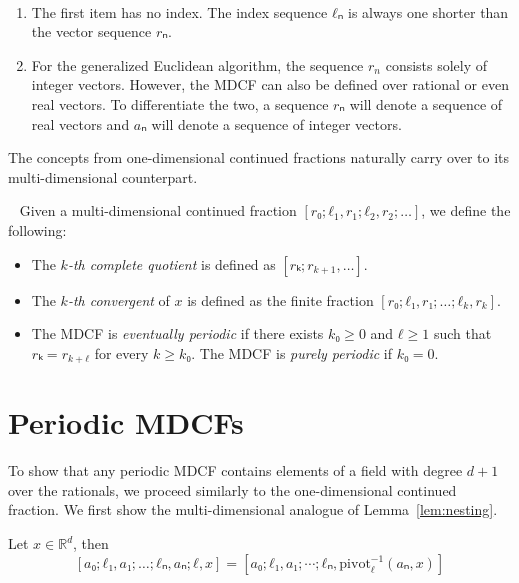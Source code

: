 \begin{remark}~
  \begin{enumerate}
    \item
      The first item has no index.
      The index sequence $ℓₙ$ is always one shorter than the vector sequence $rₙ$.
    \item
      For the generalized Euclidean algorithm, the sequence $r_n$ consists solely of integer vectors.
      However, the MDCF can also be defined over rational or even real vectors.
      To differentiate the two, a sequence $rₙ$ will denote a sequence of real
      vectors and $aₙ$ will denote a sequence of integer vectors.
  \end{enumerate}
\end{remark}

The concepts from one-dimensional continued fractions naturally carry over to its
multi-dimensional counterpart.

\begin{definition}~
  Given a multi-dimensional continued fraction $[r₀; ℓ_1, r_1; ℓ_2, r_2; …]$,
  we define the following:
  \begin{itemize}
    \item The \emph{$k$-th complete quotient} is defined as $[rₖ; r_{k+1}, …]$.
    \item The \emph{$k$-th convergent} of $x$ is defined as the finite fraction $[r₀; ℓ₁, r₁; …; ℓ_k, r_k]$.
    \item The MDCF is \emph{eventually periodic} if there exists $k₀ ≥ 0$ and $ℓ ≥ 1$ such that $rₖ = r_{k+ℓ}$ for every $k ≥ k₀$.
      The MDCF is \emph{purely periodic} if $k₀ = 0$.
  \end{itemize}
\end{definition}

\section{Periodic MDCFs}

To show that any periodic MDCF contains elements of a field with degree $d + 1$
over the rationals, we proceed similarly to the one-dimensional continued
fraction.
We first show the multi-dimensional analogue of Lemma~\vref{lem:nesting}.

\begin{lemma}[Nesting]
  \label{lem:mdcf-nesting}
  Let $x ∈ ℝ^d$, then
  \[
    [a₀; ℓ₁, a₁; …; ℓₙ, aₙ; ℓ, x]
    = [a₀; ℓ₁, a₁; \cdots; ℓₙ, \mathrm{pivot}_{ℓ}^{-1}(aₙ, x)]
  \]
\end{lemma}

